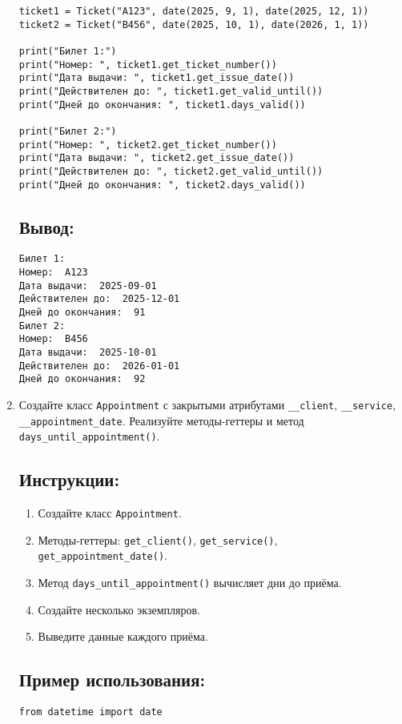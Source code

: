 \begin{enumerate}
\begin{lstlisting}[caption=Пример кода]
ticket1 = Ticket("A123", date(2025, 9, 1), date(2025, 12, 1))
ticket2 = Ticket("B456", date(2025, 10, 1), date(2026, 1, 1))

print("Билет 1:")
print("Номер: ", ticket1.get_ticket_number())
print("Дата выдачи: ", ticket1.get_issue_date())
print("Действителен до: ", ticket1.get_valid_until())
print("Дней до окончания: ", ticket1.days_valid())

print("Билет 2:")
print("Номер: ", ticket2.get_ticket_number())
print("Дата выдачи: ", ticket2.get_issue_date())
print("Действителен до: ", ticket2.get_valid_until())
print("Дней до окончания: ", ticket2.days_valid())
\end{lstlisting}

\subsection*{Вывод:}
\begin{lstlisting}[caption=Ожидаемый вывод]
Билет 1:
Номер:  A123
Дата выдачи:  2025-09-01
Действителен до:  2025-12-01
Дней до окончания:  91
Билет 2:
Номер:  B456
Дата выдачи:  2025-10-01
Действителен до:  2026-01-01
Дней до окончания:  92
\end{lstlisting}

\item
Создайте класс \texttt{Appointment} с закрытыми атрибутами \texttt{\_\_client}, \texttt{\_\_service}, \texttt{\_\_appointment\_date}. Реализуйте методы-геттеры и метод \texttt{days\_until\_appointment()}.
\subsection*{Инструкции:}
\begin{enumerate}
    \item Создайте класс \texttt{Appointment}.
    \item Методы-геттеры: \texttt{get\_client()}, \texttt{get\_service()}, \texttt{get\_appointment\_date()}.
    \item Метод \texttt{days\_until\_appointment()} вычисляет дни до приёма.
    \item Создайте несколько экземпляров.
    \item Выведите данные каждого приёма.
\end{enumerate}

\subsection*{Пример использования:}
\begin{lstlisting}[caption=Пример кода]
from datetime import date


\end{lstlisting}
\end{enumerate}
